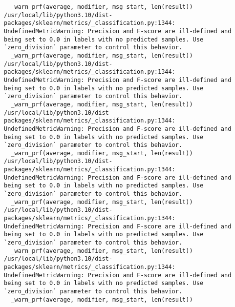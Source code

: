 \documentclass[
  letterpaper,
]{krantz}
\begin{document}
\begin{verbatim}
  _warn_prf(average, modifier, msg_start, len(result))
/usr/local/lib/python3.10/dist-packages/sklearn/metrics/_classification.py:1344: UndefinedMetricWarning: Precision and F-score are ill-defined and being set to 0.0 in labels with no predicted samples. Use `zero_division` parameter to control this behavior.
  _warn_prf(average, modifier, msg_start, len(result))
/usr/local/lib/python3.10/dist-packages/sklearn/metrics/_classification.py:1344: UndefinedMetricWarning: Precision and F-score are ill-defined and being set to 0.0 in labels with no predicted samples. Use `zero_division` parameter to control this behavior.
  _warn_prf(average, modifier, msg_start, len(result))
/usr/local/lib/python3.10/dist-packages/sklearn/metrics/_classification.py:1344: UndefinedMetricWarning: Precision and F-score are ill-defined and being set to 0.0 in labels with no predicted samples. Use `zero_division` parameter to control this behavior.
  _warn_prf(average, modifier, msg_start, len(result))
/usr/local/lib/python3.10/dist-packages/sklearn/metrics/_classification.py:1344: UndefinedMetricWarning: Precision and F-score are ill-defined and being set to 0.0 in labels with no predicted samples. Use `zero_division` parameter to control this behavior.
  _warn_prf(average, modifier, msg_start, len(result))
/usr/local/lib/python3.10/dist-packages/sklearn/metrics/_classification.py:1344: UndefinedMetricWarning: Precision and F-score are ill-defined and being set to 0.0 in labels with no predicted samples. Use `zero_division` parameter to control this behavior.
  _warn_prf(average, modifier, msg_start, len(result))
/usr/local/lib/python3.10/dist-packages/sklearn/metrics/_classification.py:1344: UndefinedMetricWarning: Precision and F-score are ill-defined and being set to 0.0 in labels with no predicted samples. Use `zero_division` parameter to control this behavior.
  _warn_prf(average, modifier, msg_start, len(result))
\end{verbatim}
\end{document}
